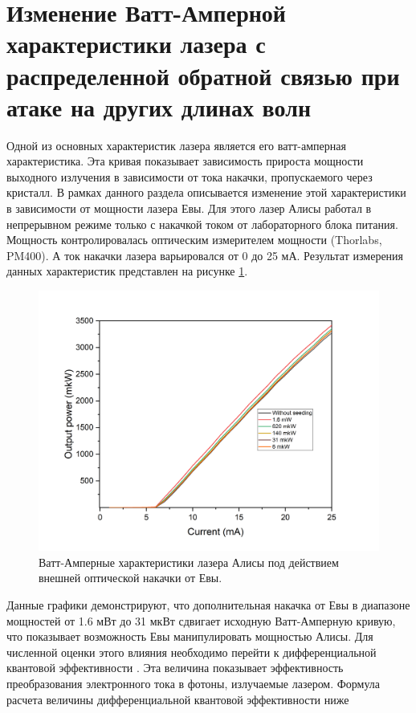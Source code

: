 \section{Изменение Ватт-Амперной характеристики лазера с распределенной обратной связью при атаке на других длинах волн}\label{sec:ch4/sect3}
Одной из основных характеристик лазера является его ватт-амперная характеристика. Эта кривая показывает зависимость прироста мощности выходного излучения в зависимости от тока накачки, пропускаемого через кристалл. В рамках данного раздела описывается изменение этой характеристики в зависимости от мощности лазера Евы.
Для этого лазер Алисы работал в непрерывном режиме только с накачкой током от лабораторного блока питания. Мощность контролировалась оптическим измерителем мощности (Thorlabs, PM400). А ток накачки лазера варьировался от 0 до 25 мА. 
Результат измерения данных характеристик представлен на рисунке \ref{fig:Watt-Amp ch4}.
\begin{figure}
    \centering
    \includegraphics[width=\linewidth]{images/ватт ампер для диссера.png}
    \caption{Ватт-Амперные характеристики лазера Алисы под действием внешней оптической накачки от Евы. \cite{fadeev2025}}
    \label{fig:Watt-Amp ch4}
\end{figure}
Данные графики демонстрируют, что дополнительная накачка от Евы в диапазоне мощностей от 1.6 мВт до 31 мкВт сдвигает исходную Ватт-Амперную кривую, что показывает возможность Евы манипулировать мощностью Алисы. Для численной оценки этого влияния необходимо перейти к дифференциальной квантовой эффективности \cite{cassidy1984,tomiyasu2017}. Эта величина показывает эффективность преобразования электронного тока в фотоны, излучаемые лазером. Формула расчета величины дифференциальной квантовой эффективности ниже 
